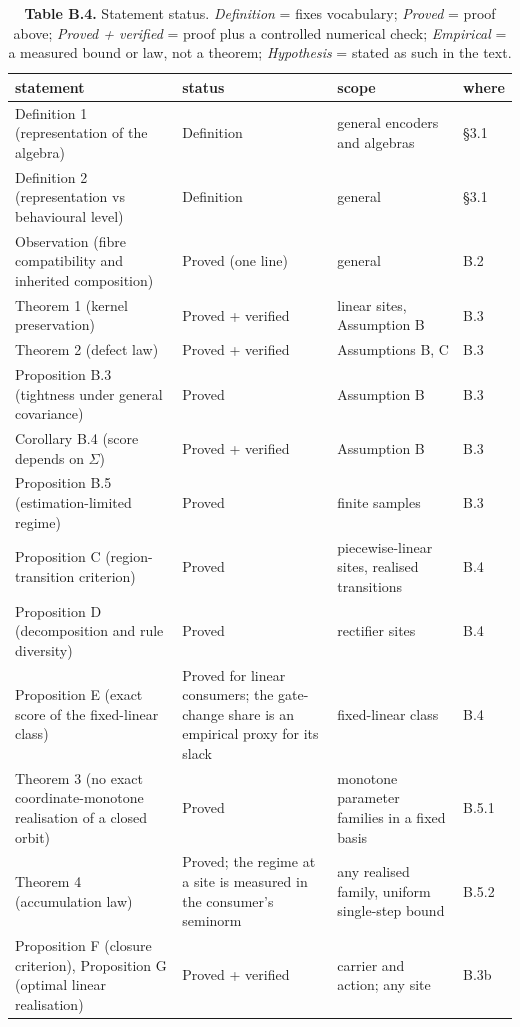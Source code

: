 \begin{table}[t]
\centering
\small
\caption*{\textbf{Table B.4.} Statement status. \textit{Definition} = fixes vocabulary; \textit{Proved} = proof above; \textit{Proved + verified} = proof plus a controlled numerical check; \textit{Empirical} = a measured bound or law, not a theorem; \textit{Hypothesis} = stated as such in the text.}
\begin{tabularx}{\textwidth}{@{}>{\raggedright\arraybackslash}X >{\raggedright\arraybackslash}X >{\raggedright\arraybackslash}X >{\raggedright\arraybackslash}X@{}}
\toprule
\textbf{statement} & \textbf{status} & \textbf{scope} & \textbf{where} \\
\midrule
Definition 1 (representation of the algebra) & Definition & general encoders and algebras & \S{}3.1 \\
Definition 2 (representation vs behavioural level) & Definition & general & \S{}3.1 \\
Observation (fibre compatibility and inherited composition) & Proved (one line) & general & B.2 \\
Theorem 1 (kernel preservation) & Proved + verified & linear sites, Assumption B & B.3 \\
Theorem 2 (defect law) & Proved + verified & Assumptions B, C & B.3 \\
Proposition B.3 (tightness under general covariance) & Proved & Assumption B & B.3 \\
Corollary B.4 (score depends on $\Sigma$) & Proved + verified & Assumption B & B.3 \\
Proposition B.5 (estimation-limited regime) & Proved & finite samples & B.3 \\
Proposition C (region-transition criterion) & Proved & piecewise-linear sites, realised transitions & B.4 \\
Proposition D (decomposition and rule diversity) & Proved & rectifier sites & B.4 \\
Proposition E (exact score of the fixed-linear class) & Proved for linear consumers; the gate-change share is an empirical proxy for its slack & fixed-linear class & B.4 \\
Theorem 3 (no exact coordinate-monotone realisation of a closed orbit) & Proved & monotone parameter families in a fixed basis & B.5.1 \\
Theorem 4 (accumulation law) & Proved; the regime at a site is measured in the consumer's seminorm & any realised family, uniform single-step bound & B.5.2 \\
Proposition F (closure criterion), Proposition G (optimal linear realisation) & Proved + verified & carrier and action; any site & B.3b \\

\end{tabularx}
\end{table}
